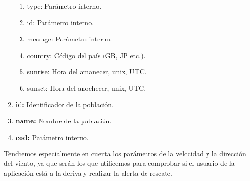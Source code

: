 \begin{enumerate}
\begin{enumerate}
\item type: Parámetro interno.
\item id: Parámetro interno.
\item message: Parámetro interno.
\item country: Código del país (GB, JP etc.).
\item sunrise: Hora del amanecer, unix, UTC.
\item sunset: Hora del anochecer, unix, UTC.
\end{enumerate}
\item  \textbf{id:} Identificador de la población.
\item  \textbf{name:} Nombre de la población.
\item  \textbf{cod:} Parámetro interno.
\end{enumerate}

Tendremos especialmente en cuenta los parámetros de la
 velocidad y la dirección del viento, ya que serán los que utilicemos
 para comprobar si el usuario de la aplicación está a la deriva y
 realizar la alerta de rescate.


